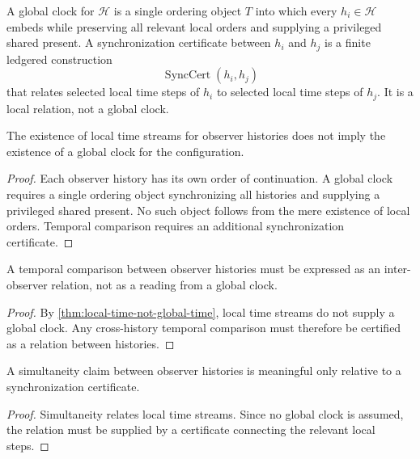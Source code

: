 \begin{definition}
\label{def:global-clock-synchronization-certificate}
A global clock for $\mathcal H$ is a single ordering object $T$ into which every $h_i\in\mathcal H$ embeds while preserving all relevant local orders and supplying a privileged shared present. A synchronization certificate between $h_i$ and $h_j$ is a finite ledgered construction
$$
\operatorname{SyncCert}(h_i,h_j)
$$
that relates selected local time steps of $h_i$ to selected local time steps of $h_j$. It is a local relation, not a global clock.
\end{definition}

\begin{theorem}
\label{thm:local-time-not-global-time}
The existence of local time streams for observer histories does not imply the existence of a global clock for the configuration.
\end{theorem}

\begin{proof}
Each observer history has its own order of continuation. A global clock requires a single ordering object synchronizing all histories and supplying a privileged shared present. No such object follows from the mere existence of local orders. Temporal comparison requires an additional synchronization certificate.
\end{proof}

\begin{corollary}
\label{cor:temporal-comparison-relational}
A temporal comparison between observer histories must be expressed as an inter-observer relation, not as a reading from a global clock.
\end{corollary}

\begin{proof}
By \autoref{thm:local-time-not-global-time}, local time streams do not supply a global clock. Any cross-history temporal comparison must therefore be certified as a relation between histories.
\end{proof}

\begin{corollary}
\label{cor:simultaneity-certificate-relative}
A simultaneity claim between observer histories is meaningful only relative to a synchronization certificate.
\end{corollary}

\begin{proof}
Simultaneity relates local time streams. Since no global clock is assumed, the relation must be supplied by a certificate connecting the relevant local steps.
\end{proof}


